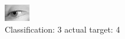 \begin{figure}[h!]
\begin{center}
\includegraphics[width=0.60\columnwidth]{figures/ID2920_class_3_target_4.png}
\end{center}
\caption{ Classification: 3 actual target: 4}
\label{fig:ID2920_class_3_target_4}
\end{figure}
